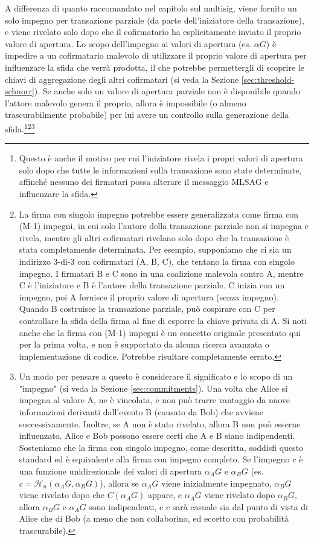 A differenza di quanto raccomandato nel capitolo sul multisig, viene fornito un solo impegno per transazione parziale (da parte dell'iniziatore della transazione), e viene rivelato solo dopo che il cofirmatario ha esplicitamente inviato il proprio valore di apertura. Lo scopo dell'impegno ai valori di apertura (es. $\alpha G$) è impedire a un cofirmatario malevolo di utilizzare il proprio valore di apertura per influenzare la sfida che verrà prodotta, il che potrebbe permettergli di scoprire le chiavi di aggregazione degli altri cofirmatari (si veda la Sezione \ref{sec:threshold-schnorr}). Se anche solo un valore di apertura parziale non è disponibile quando l’attore malevolo genera il proprio, allora è impossibile (o almeno trascurabilmente probabile) per lui avere un controllo sulla generazione della sfida.\footnote{Questo è anche il motivo per cui l’iniziatore rivela i propri valori di apertura solo dopo che tutte le informazioni sulla transazione sono state determinate, affinché nessuno dei firmatari possa alterare il messaggio MLSAG e influenzare la sfida.}\footnote{La firma con singolo impegno potrebbe essere generalizzata come firma con (M-1) impegni, in cui solo l’autore della transazione parziale non si impegna e rivela, mentre gli altri cofirmatari rivelano solo dopo che la transazione è stata completamente determinata. Per esempio, supponiamo che ci sia un indirizzo 3-di-3 con cofirmatari (A, B, C), che tentano la firma con singolo impegno. I firmatari B e C sono in una coalizione malevola contro A, mentre C è l’iniziatore e B è l’autore della transazione parziale. C inizia con un impegno, poi A fornisce il proprio valore di apertura (senza impegno). Quando B costruisce la transazione parziale, può cospirare con C per controllare la sfida della firma al fine di esporre la chiave privata di A. Si noti anche che la firma con (M-1) impegni è un concetto originale presentato qui per la prima volta, e non è supportato da alcuna ricerca avanzata o implementazione di codice. Potrebbe risultare completamente errato.}\footnote{Un modo per pensare a questo è considerare il significato e lo scopo di un "impegno" (si veda la Sezione \ref{sec:commitments}). Una volta che Alice si impegna al valore A, ne è vincolata, e non può trarre vantaggio da nuove informazioni derivanti dall'evento B (causato da Bob) che avviene successivamente. Inoltre, se A non è stato rivelato, allora B non può esserne influenzato. Alice e Bob possono essere certi che A e B siano indipendenti. Sosteniamo che la firma con singolo impegno, come descritta, soddisfi questo standard ed è equivalente alla firma con impegno completo. Se l’impegno $c$ è una funzione unidirezionale dei valori di apertura $\alpha_A G$ e $\alpha_B G$ (es. $c = \mathcal{H}_n(\alpha_A G,\alpha_B G)$), allora se $\alpha_A G$ viene inizialmente impegnato, $\alpha_B G$ viene rivelato dopo che $C(\alpha_A G)$ appare, e $\alpha_A G$ viene rivelato dopo $\alpha_B G$, allora $\alpha_B G$ e $\alpha_A G$ sono indipendenti, e $c$ sarà casuale sia dal punto di vista di Alice che di Bob (a meno che non collaborino, ed eccetto con probabilità trascurabile).}

